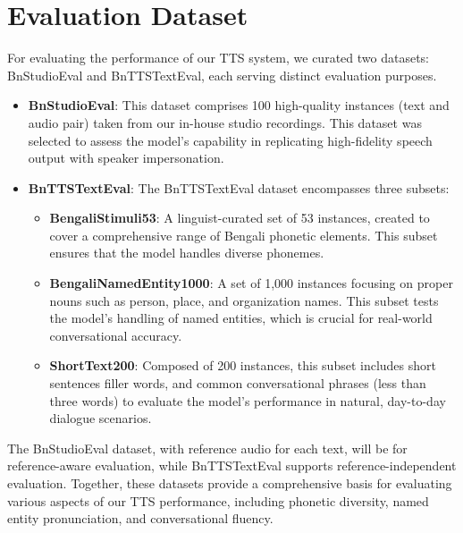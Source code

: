 

\section{Evaluation Dataset}

For evaluating the performance of our TTS system, we curated two datasets: BnStudioEval and BnTTSTextEval, each serving distinct evaluation purposes.

\begin{itemize}
    \item \textbf{BnStudioEval}: This dataset comprises 100 high-quality instances (text and audio pair) taken from our in-house studio recordings. This dataset was selected to assess the model’s capability in replicating high-fidelity speech output with speaker impersonation. 
    
    \item \textbf{BnTTSTextEval}: The BnTTSTextEval dataset encompasses three subsets: \begin{itemize}
        \item \textbf{BengaliStimuli53}: A linguist-curated set of 53 instances, created to cover a comprehensive range of Bengali phonetic elements. This subset ensures that the model handles diverse phonemes.
        
        \item \textbf{BengaliNamedEntity1000}: A set of 1,000 instances focusing on proper nouns such as person, place, and organization names. This subset tests the model's handling of named entities, which is crucial for real-world conversational accuracy.
        \item \textbf{ShortText200}: Composed of 200 instances, this subset includes short sentences  filler words, and common conversational phrases (less than three words) to evaluate the model’s performance in natural, day-to-day dialogue scenarios.
    \end{itemize}  
\end{itemize}

The BnStudioEval dataset, with reference audio for each text, will be for reference-aware evaluation, while BnTTSTextEval supports reference-independent evaluation. Together, these datasets provide a comprehensive basis for evaluating various aspects of our TTS performance, including phonetic diversity, named entity pronunciation, and conversational fluency. 

